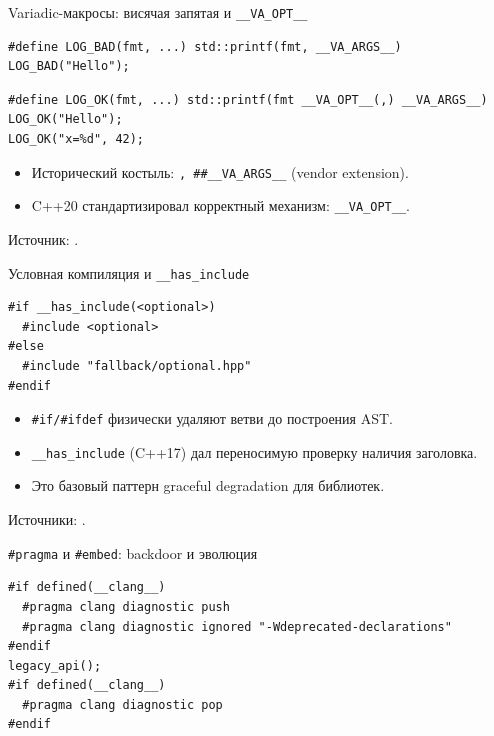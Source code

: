 \documentclass{beamer}
\begin{document}
\begin{frame}[fragile]{Variadic-макросы: висячая запятая и \texttt{\_\_VA\_OPT\_\_}}
\begin{lstlisting}
#define LOG_BAD(fmt, ...) std::printf(fmt, __VA_ARGS__)
LOG_BAD("Hello");
\end{lstlisting}
\begin{lstlisting}
#define LOG_OK(fmt, ...) std::printf(fmt __VA_OPT__(,) __VA_ARGS__)
LOG_OK("Hello");
LOG_OK("x=%d", 42);
\end{lstlisting}
    \begin{itemize}
        \item Исторический костыль: \texttt{, \#\#\_\_VA\_ARGS\_\_} (vendor extension).
        \item C++20 стандартизировал корректный механизм: \texttt{\_\_VA\_OPT\_\_}.
    \end{itemize}
    \vspace{0.3em}
    Источник: \cite{wg21_p0306r4}.
\end{frame}

\begin{frame}[fragile]{Условная компиляция и \texttt{\_\_has\_include}}
\begin{lstlisting}
#if __has_include(<optional>)
  #include <optional>
#else
  #include "fallback/optional.hpp"
#endif
\end{lstlisting}
    \begin{itemize}
        \item \texttt{\#if/\#ifdef} физически удаляют ветви до построения AST.
        \item \texttt{\_\_has\_include} (C++17) дал переносимую проверку наличия заголовка.
        \item Это базовый паттерн graceful degradation для библиотек.
    \end{itemize}
    \vspace{0.3em}
    Источники: \cite{cpp_draft_cpp_cond,wg21_p0061r1}.
\end{frame}

\begin{frame}[fragile]{\texttt{\#pragma} и \texttt{\#embed}: backdoor и эволюция}
\begin{lstlisting}
#if defined(__clang__)
  #pragma clang diagnostic push
  #pragma clang diagnostic ignored "-Wdeprecated-declarations"
#endif
legacy_api();
#if defined(__clang__)
  #pragma clang diagnostic pop
#endif
\end{lstlisting}
\end{frame}
\end{document}
